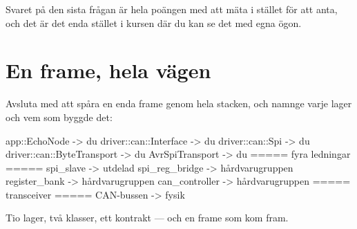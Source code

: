 Svaret på den sista frågan är hela poängen med att mäta i stället för att anta, och det är det
enda stället i kursen där du kan se det med egna ögon.

\section{En frame, hela vägen}
\label{sec:endtoend}

Avsluta med att spåra en enda frame genom hela stacken, och namnge varje lager och vem som byggde
det:

\begin{console}
app::EchoNode            -> du
driver::can::Interface   -> du
driver::can::Spi         -> du
driver::can::ByteTransport -> du
AvrSpiTransport          -> du
===== fyra ledningar =====
spi_slave                -> utdelad
spi_reg_bridge           -> hårdvarugruppen
register_bank            -> hårdvarugruppen
can_controller           -> hårdvarugruppen
===== transceiver =====
CAN-bussen               -> fysik
\end{console}

Tio lager, två klasser, ett kontrakt --- och en frame som kom fram.
